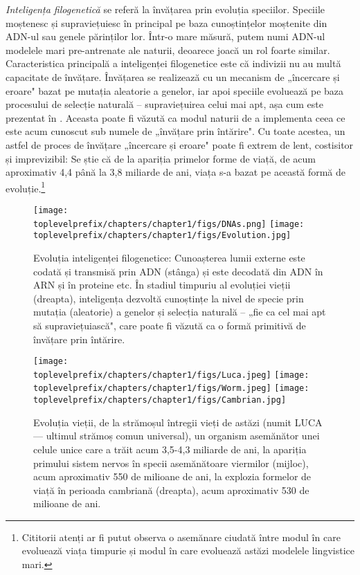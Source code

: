 \documentclass[../../book-main_ro.tex]{subfiles}
\begin{document}
{\em Inteligența filogenetică} se referă la învățarea prin evoluția speciilor. Speciile moștenesc și supraviețuiesc în principal pe baza cunoștințelor moștenite din ADN-ul sau genele părinților lor. Într-o mare măsură, putem numi ADN-ul modelele mari pre-antrenate ale naturii, deoarece joacă un rol foarte similar. Caracteristica principală a inteligenței filogenetice este că indivizii nu au multă capacitate de învățare. Învățarea se realizează cu un mecanism de „încercare și eroare" bazat pe mutația aleatorie a genelor, iar apoi speciile evoluează pe baza procesului de selecție naturală -- supraviețuirea celui mai apt, așa cum este prezentat în .
Aceasta poate fi văzută ca modul naturii de a implementa ceea ce este acum cunoscut sub numele de „învățare prin întărire". Cu toate acestea, un astfel de proces de învățare „încercare și eroare" poate fi extrem de lent, costisitor și imprevizibil: Se știe că de la apariția primelor forme de viață, de acum aproximativ 4,4 până la 3,8 miliarde de ani, viața s-a bazat pe această formă de evoluție.\footnote{Cititorii atenți ar fi putut observa o asemănare ciudată între modul în care evoluează viața timpurie și modul în care evoluează astăzi modelele lingvistice mari.}
\begin{figure}
    \centering
\texttt{[image: \\toplevelprefix/chapters/chapter1/figs/DNAs.png]}
\texttt{[image: \\toplevelprefix/chapters/chapter1/figs/Evolution.jpg]}
    \caption{Evoluția inteligenței filogenetice: Cunoașterea lumii externe este codată și transmisă prin ADN (stânga) și este decodată din ADN în ARN și în proteine etc. În stadiul timpuriu al evoluției vieții (dreapta), inteligența dezvoltă cunoștințe la nivel de specie prin mutația (aleatorie) a genelor și selecția naturală -- „fie ca cel mai apt să supraviețuiască", care poate fi văzută ca o formă primitivă de învățare prin întărire.}
    \label{fig:phylogenetic}
\end{figure}
\begin{figure}
    \centering
\texttt{[image: \\toplevelprefix/chapters/chapter1/figs/Luca.jpeg]}
\texttt{[image: \\toplevelprefix/chapters/chapter1/figs/Worm.jpeg]}
\texttt{[image: \\toplevelprefix/chapters/chapter1/figs/Cambrian.jpg]}
    \caption{Evoluția vieții, de la strămoșul întregii vieți de astăzi (numit LUCA --- ultimul strămoș comun universal), un organism asemănător unei celule unice care a trăit acum 3,5-4,3 miliarde de ani, la apariția primului sistem nervos în specii asemănătoare viermilor (mijloc), acum aproximativ 550 de milioane de ani, la explozia formelor de viață în perioada cambriană (dreapta), acum aproximativ 530 de milioane de ani.}
    \label{fig:evolution}
\end{figure}
\end{document}
